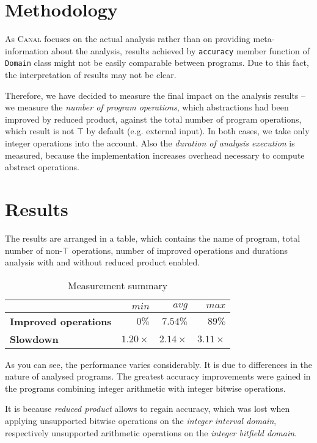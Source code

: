 \documentclass[12pt,oneside]{fithesis2}
\theoremstyle{definition}
\begin{document}
\section{Methodology}

As \textsc{Canal} focuses on the actual analysis rather than on providing meta-information about the analysis, results achieved by \texttt{accuracy} member function of \texttt{Domain} class might not be easily comparable between programs. Due to this fact, the interpretation of results may not be clear.

Therefore, we have decided to measure the final impact on the analysis results -- we measure the \textit{number of program operations}, which abstractions had been improved by reduced product, against the total number of program operations, which result is not $\top$ by default (e.g. external input). In both cases, we take only integer operations into the account. Also the \textit{duration of analysis execution} is measured, because the implementation increases overhead necessary to compute abstract operations.

\section{Results}

The results are arranged in a table, which contains the name of program, total number of non-$\top$ operations, number of improved operations and durations analysis with and without reduced product enabled.

\begin{table}
  \centering
  \begin{tabular}{l r r r}
     & $min$ & $avg$ & $max$ \\
     \midrule
    \textbf{Improved operations} & $0\%$ & $7.54\%$ & $89\%$\\
    \textbf{Slowdown} & $1.20\times$ & $2.14\times$ & $3.11\times$\\
  \end{tabular}
  \caption{Measurement summary}
\end{table}

As you can see, the performance varies considerably. It is due to differences in the nature of analysed programs. The greatest accuracy improvements were gained in the programs combining integer arithmetic with integer bitwise operations.

It is because \textit{reduced product} allows to regain accuracy, which was lost when applying unsupported bitwise operations on the \textit{integer interval domain}, respectively unsupported arithmetic operations on the \textit{integer bitfield domain}.
\end{document}
